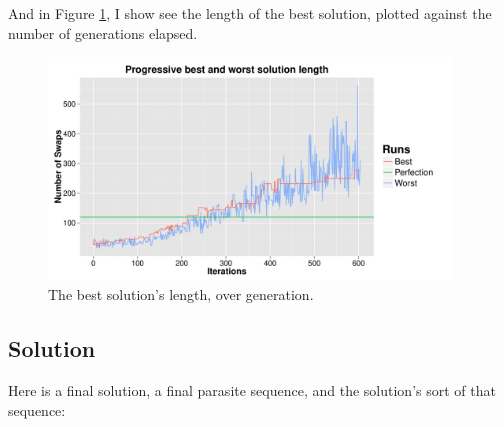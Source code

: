 \documentclass[11pt]{article}
\begin{document}
\noindent
And in Figure \ref{fig:best-solution-length}, I show see the length of the best solution, plotted against the number of generations elapsed.

\begin{figure}[H]
  \centering
  \includegraphics[width=0.95\textwidth]{results/output-i600-length.pdf}
  \caption{The best solution's length, over generation.}
  \label{fig:best-solution-length}
\end{figure}

\subsection{Solution}

Here is a final solution, a final parasite sequence, and the solution's sort of that sequence:
\end{document}
